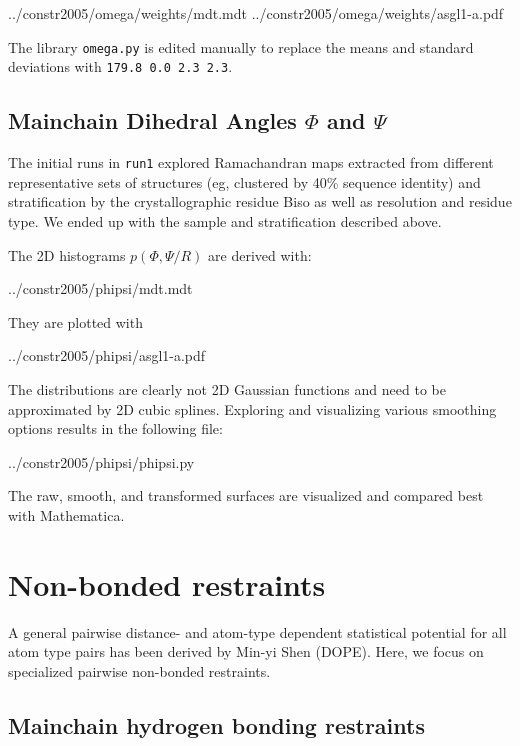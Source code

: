            {../constr2005/omega/weights/mdt.mdt}
           {../constr2005/omega/weights/asgl1-a.pdf}

The library {\tt omega.py} is edited manually to replace the means and standard deviations 
with {\tt 179.8  0.0   2.3  2.3}.


\subsection{Mainchain Dihedral Angles $\Phi$ and $\Psi$}

The initial runs in {\tt run1} explored Ramachandran maps extracted from different representative 
sets of structures (eg, clustered by 40\% sequence identity) and stratification by the 
crystallographic residue Biso as well as resolution and residue type. We ended up with
the sample and stratification described above.

The 2D histograms $p(\Phi, \Psi / R)$ are derived with:

           {../constr2005/phipsi/mdt.mdt}

They are plotted with

           {../constr2005/phipsi/asgl1-a.pdf}

The distributions are clearly not 2D Gaussian functions and need to be approximated by 2D cubic splines.
Exploring and visualizing various smoothing options results in the following file:

           {../constr2005/phipsi/phipsi.py}

The raw, smooth, and transformed surfaces are visualized and compared best
with Mathematica.

\section{Non-bonded restraints}

A general pairwise distance- and atom-type dependent statistical potential for all atom type pairs 
has been derived by Min-yi Shen (DOPE). Here, we focus on specialized pairwise non-bonded restraints.

\subsection{Mainchain hydrogen bonding restraints}

